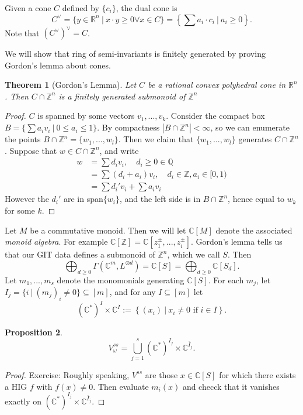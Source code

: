 \documentclass{article}
\newtheorem{theorem}{Theorem}
\newtheorem{prop}[theorem]{Proposition}
\theoremstyle{definition}
\theoremstyle{remark}
\numberwithin{theorem}{section}
\newcommand{\C}{\mathbb{C}}
\newcommand{\Z}{\mathbb{Z}}
\newenvironment{thm}{
\begin{mdframed}
	\vspace{-0.5em}
	\begin{theorem}
}{
	\end{theorem}
\end{mdframed}
}
\begin{document}
	Given a cone $C$ defined by $\{c_i\}$, the dual cone is
	$$C^\vee = \{y\in\mathbb{R}^n ~|~ x\cdot y \geq 0 \forall x\in C\} = \left\{ \sum a_i\cdot c_i ~|~ a_i\geq 0 \right\}.$$
	Note that $(C^\vee)^\vee = C$. \vspace{1em}
	
	We will show that ring of semi-invariants is finitely generated by proving Gordon's lemma about cones.
	\begin{thm}[Gordon's Lemma]
		Let $C$ be a rational convex polyhedral cone in $\mathbb{R}^n$. Then $C\cap \mathbb{Z}^n$ is a finitely generated submonoid of $\mathbb{Z}^n$
	\end{thm}
	\begin{proof}
		$C$ is spanned by some vectors $v_1,...,v_k$. Consider the compact box $B=\{\sum a_i v_i ~|~ 0\leq a_i \leq 1\}.$ By compactness $|B\cap \mathbb{Z}^n| < \infty$, so we can enumerate the points $B\cap \mathbb{Z}^n = \{w_1,...,w_l\}$. Then we claim that $\{w_1,...,w_l\}$ generates $C\cap \mathbb{Z}^n$. Suppose that $w\in C\cap \mathbb{Z}^n$, and write
		\begin{align*}
			w &= \sum d_i v_i, \quad d_i \geq 0 \in \mathbb{Q}\\
			&= \sum(d_i + a_i)v_i, \quad d_i\in\mathbb{Z}, a_i\in [0,1)\\
			&= \sum d_i'v_i + \sum a_i v_i
		\end{align*}
		However the $d_i'$ are in span$\{w_i\}$, and the left side is in $B\cap \mathbb{Z}^n$, hence equal to $w_k$ for some $k$.
	\end{proof}
	Let $M$ be a commutative monoid. Then we will let $\C[M]$ denote the associated \emph{monoid algebra}. For example $\C[\mathbb{Z}] = \C[z_1^{\pm},...,z_i^{\pm}]$. Gordon's lemma tells us that our GIT data defines a submonoid of $\Z^n$, which we call $S$. Then 
	$$ \bigoplus_{d\geq 0}\Gamma(\C^m, L^{\otimes d}) = \C[S] = \bigoplus_{d\geq 0 }\C[S_d].$$
	Let $m_1,...,m_s$ denote the monomonials generating $\C[S]$. For each $m_j$, let $I_j = \{i ~|~ (m_j)_i \neq 0 \} \subseteq [m]$, and for any $I\subseteq [m]$ let
	$$(\C^\ast)^I \times \C^{\overline{I}} := \left\{ (x_i) ~|~ x_i\neq 0 \text{ if } i\in I  \right\}.$$ 
	\begin{prop}
		$$V_\omega^{ss} = \bigcup_{j=1}^s (\C^\ast)^{I_j}\times \C^{\overline{I}_j}.$$
	\end{prop}
	\begin{proof}
		Exercise: Roughly speaking, $V^{ss}$ are those $x \in \C[S]$ for which there exists a HIG $f$ with $f(x)\neq 0$. Then evaluate $m_i(x)$ and checck that it vanishes exactly on $(\C^\ast)^{I_j}\times \C^{\overline{I}_j}$. 
	\end{proof}
\end{document}
